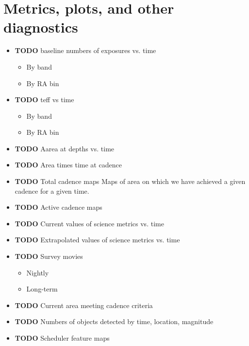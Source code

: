 \section{Metrics, plots, and other diagnostics}
\label{sec:org3bb15f2}
\begin{itemize}
\item {\bfseries\sffamily TODO} baseline numbers of exposures vs. time
\label{sec:orgbbc9f8e}
\begin{itemize}
\item By band
\label{sec:org820f18b}
\item By RA bin
\label{sec:org9747adc}
\end{itemize}
\item {\bfseries\sffamily TODO} teff vs time
\label{sec:org49467d6}
\begin{itemize}
\item By band
\label{sec:orgb66dcdf}
\item By RA bin
\label{sec:org24c5dff}
\end{itemize}
\item {\bfseries\sffamily TODO} Aarea at depths vs. time
\label{sec:org70dccaf}
\item {\bfseries\sffamily TODO} Area times time at cadence
\label{sec:org195d214}
\item {\bfseries\sffamily TODO} Total cadence maps
\label{sec:org22d455e}
Maps of area on which we have achieved a given cadence for a given time.
\item {\bfseries\sffamily TODO} Active cadence maps
\label{sec:org9e8d8fa}
\item {\bfseries\sffamily TODO} Current values of science metrics vs. time
\label{sec:org76e6337}
\item {\bfseries\sffamily TODO} Extrapolated values of science metrics vs. time
\label{sec:orgf4250d3}
\item {\bfseries\sffamily TODO} Survey movies
\label{sec:org24fcc1c}
\begin{itemize}
\item Nightly
\label{sec:org7e175c7}
\item Long-term
\label{sec:orgacd187f}
\end{itemize}
\item {\bfseries\sffamily TODO} Current area meeting cadence criteria
\label{sec:orge05779b}
\item {\bfseries\sffamily TODO} Numbers of objects detected by time, location, magnitude
\label{sec:org47e7a61}
\item {\bfseries\sffamily TODO} Scheduler feature maps

\end{itemize}

